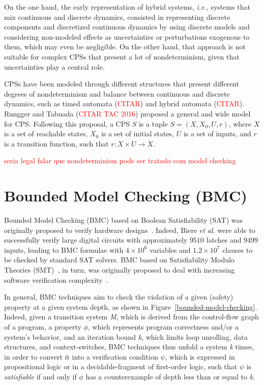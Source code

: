 \documentclass{acm_sen_article}
\begin{document}
On the one hand, the early representation of hybrid systems, {\it i.e.}, systems that mix continuous and discrete dynamics, consisted in representing discrete components and discretized continuous dynamics by using discrete models and considering non-modeled effects as uncertainties or perturbations exogenous to them, which may even be negligible. On the other hand, that approach is not suitable for complex CPSs that present a lot of nondeterminism, given that uncertainties play a central role.

CPSs have been modeled through different structures that present different degrees of nondeterminism and balance between continuous and discrete dynamics, such as timed automata (\textcolor{red}{CITAR}) and hybrid automata (\textcolor{red}{CITAR}). Rungger and Tabuada (\textcolor{red}{CITAR TAC 2016}) proposed a general and wide model for CPS. Following this proposal, a CPS $S$ is a tuple $S=(X,X_{0},U,r)$, where $X$ is a set of reachable states, $X_{0}$ is a set of initial states, $U$ is a set of inputs, and $r$ is a transition function, such that $r:X\times U \rightarrow X$.

\textcolor{red}{seria legal falar que nondeterminism pode ser tratado com model checking}

\section{Bounded Model Checking (BMC)}
\label{Preliminaries}

Bounded Model Checking (BMC) based on Boolean Satisfiability (SAT) was originally proposed to verify hardware designs~\cite{Biere99,handbook09}. Indeed, Biere {\it et al.} were able to successfully verify large digital circuits with approximately $9510$ latches and $9499$ inputs, leading to BMC formulae with $4 \times 10^6$ variables and $1.2 \times 10^7$ clauses to be checked by standard SAT solvers. BMC based on Satisfiability Modulo Theories (SMT)~\cite{BarrettSST09}, in turn, was originally proposed to deal with increasing software verification complexity~\cite{Armando06}. 

In general, BMC techniques aim to check the violation of a given (safety) property at a given system depth, as shown in Figure~\ref{bounded-model-checking}. Indeed, given a transition system \textit{M}, which is derived from the control-flow graph of a program, a property $\phi$, which represents program correctness and/or a system's behavior, and an iteration bound \textit{k}, which limits loop unrolling, data structures, and context-switches, BMC techniques thus unfold a system \textit{k} times, in order to convert it into a verification condition $\psi$, which is expressed in propositional logic or in a decidable-fragment of first-order logic, such that $\psi$ is \textit{satisfiable} if and only if $\phi$ has a counterexample of depth less than or equal to \textit{k}.
\end{document}
